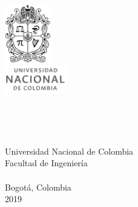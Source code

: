 \documentclass[
11pt, %
english, %
singlespacing, %
headsepline, %
]{MastersDoctoralThesis} %
\author{Elkin Alejandro \textsc{Cruz Camacho}} %
\begin{document}
\frontmatter %

\pagestyle{plain} %


\begin{titlepage}
\begin{center}

\vspace*{.06\textheight}
\includegraphics[width=0.15\textwidth]{figures/escudo.png}\\
\includegraphics[width=0.20\textwidth]{figures/escudo_title.png}\\
\vspace{2cm} %

\HRule \\[0.4cm] %
{\huge \bfseries \ttitle\par}\vspace{0.4cm} %
\HRule \\[2cm] %

{\Large \authorname}

\vfill

\begin{spanish}
Universidad Nacional de Colombia\\
Facultad de Ingeniería\\
\deptname\\
Bogotá, Colombia\\
2019
\end{spanish}

\end{center}
\end{titlepage}


\cleardoublepage
\end{document}
